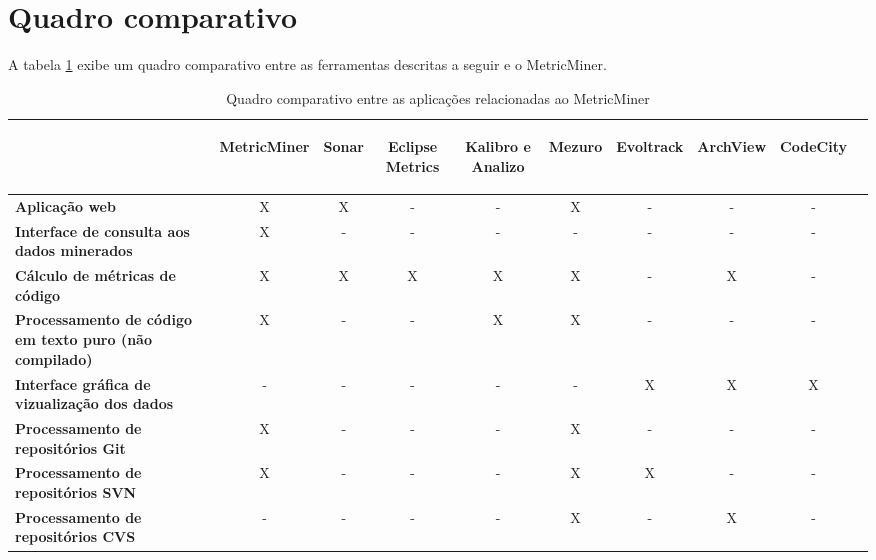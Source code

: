 \documentclass[a4paper, 12pt, twoside]{book}
\begin{document}
    \section{Quadro comparativo}


    A tabela \ref{tab:relacionados} exibe um quadro comparativo entre as ferramentas descritas a seguir e o MetricMiner.
    \begin{table}\begin{center}
        \begin{tabular}{| p{8cm} | c | c | c | c | c | c | c | c | c |}
            \hline                        
             &  \begin{sideways}\bf MetricMiner\end{sideways} & \begin{sideways}\bf Sonar\end{sideways} & \begin{sideways}\bf Eclipse Metrics\end{sideways} & \begin{sideways}\bf Kalibro e Analizo\end{sideways} & \begin{sideways}\bf Mezuro\end{sideways} & \begin{sideways}\bf Evoltrack\end{sideways} & \begin{sideways}\bf ArchView\end{sideways} & \begin{sideways}\bf CodeCity\end{sideways} \\
            \hline
            \textbf{Aplicação web} & X & X & - & - & X & - & - & - \\
            \hline
            \textbf{Interface de consulta aos dados minerados} & X & - & - & - & - & - & - & - \\
            \hline
            \textbf{Cálculo de métricas de código} & X & X & X & X & X & - & X & - \\
            \hline
            \textbf{Processamento de código em texto puro (não compilado)} & X & - & - & X & X & - & - & - \\
            \hline
            \textbf{Interface gráfica de vizualização dos dados} & - & - & - & - & - & X & X & X \\
            \hline
            \textbf{Processamento de repositórios Git} & X & - & - & - & X & - & - & - \\
            \hline
            \textbf{Processamento de repositórios SVN} & X & - & - & - & X & X & - & - \\
            \hline
            \textbf{Processamento de repositórios CVS} & - & - & - & - & X & - & X & - \\
            \hline
        \end{tabular}
        \caption{Quadro comparativo entre as aplicações relacionadas ao MetricMiner \label{tab:relacionados}}
    \end{center}\end{table}
\end{document}
